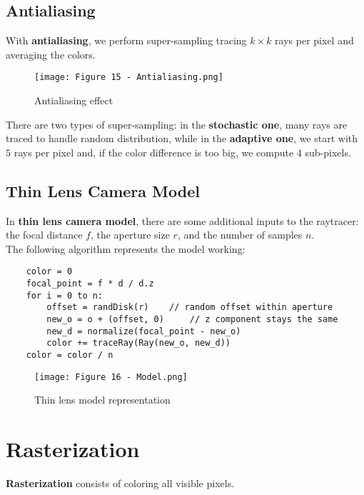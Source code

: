 \documentclass{article}
\begin{document}
\subsection{Antialiasing}
With \textbf{antialiasing}, we perform super-sampling tracing $k \times k$ rays per pixel and averaging the colors.
\begin{figure}[H]
    \centering
    \texttt{[image: Figure 15 - Antialiasing.png]}
    \caption{Antialiasing effect}
\end{figure}
\noindent
There are two types of super-sampling: in the \textbf{stochastic one}, many rays are traced to handle random distribution, while in the \textbf{adaptive one}, we start with $5$ rays per pixel and, if the color difference is too big, we compute $4$ sub-pixels.
\subsection{Thin Lens Camera Model}
In \textbf{thin lens camera model}, there are some additional inputs to the raytracer: the focal distance $f$, the aperture size $r$, and the number of samples $n$. \\
The following algorithm represents the model working:
\begin{verbatim}
    color = 0
    focal_point = f * d / d.z
    for i = 0 to n:
        offset = randDisk(r)    // random offset within aperture
        new_o = o + (offset, 0)     // z component stays the same
        new_d = normalize(focal_point - new_o)
        color += traceRay(Ray(new_o, new_d))
    color = color / n
\end{verbatim}
\begin{figure}[H]
    \centering
    \texttt{[image: Figure 16 - Model.png]}
    \caption{Thin lens model representation}
\end{figure}

\newpage

\section{Rasterization}
\textbf{Rasterization} consists of coloring all visible pixels.
\end{document}
